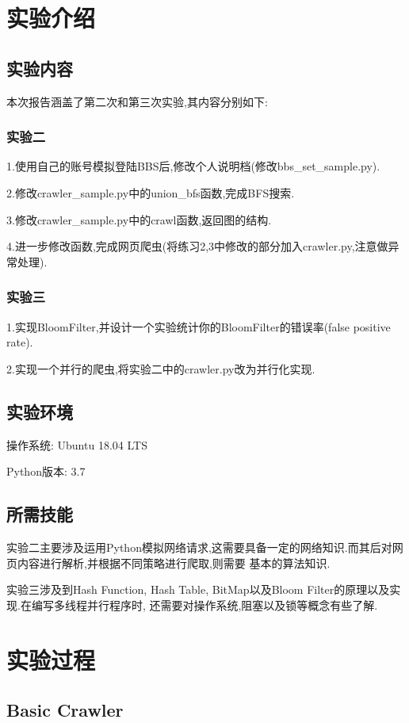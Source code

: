 \documentclass[a4paper]{article}
\begin{document}
    \tableofcontents
    \newpage
    \section{实验介绍}
        \subsection{实验内容}
本次报告涵盖了第二次和第三次实验,其内容分别如下:
            \subsubsection{实验二}
1.使用自己的账号模拟登陆BBS后,修改个人说明档(修改bbs\_set\_sample.py).

2.修改crawler\_sample.py中的union\_bfs函数,完成BFS搜索.

3.修改crawler\_sample.py中的crawl函数,返回图的结构.

4.进一步修改函数,完成网页爬虫(将练习2,3中修改的部分加入crawler.py,注意做异常处理).
            \subsubsection{实验三}
1.实现BloomFilter,并设计一个实验统计你的BloomFilter的错误率(false positive rate).

2.实现一个并行的爬虫,将实验二中的crawler.py改为并行化实现.


        \subsection{实验环境}
操作系统: Ubuntu 18.04 LTS

Python版本: 3.7
        \subsection{所需技能}
实验二主要涉及运用Python模拟网络请求,这需要具备一定的网络知识.而其后对网页内容进行解析,并根据不同策略进行爬取,则需要
基本的算法知识.

实验三涉及到Hash Function, Hash Table, BitMap以及Bloom Filter的原理以及实现.在编写多线程并行程序时,
还需要对操作系统,阻塞以及锁等概念有些了解.
    \newpage
    \section{实验过程}
        \subsection{Basic Crawler}
\end{document}
